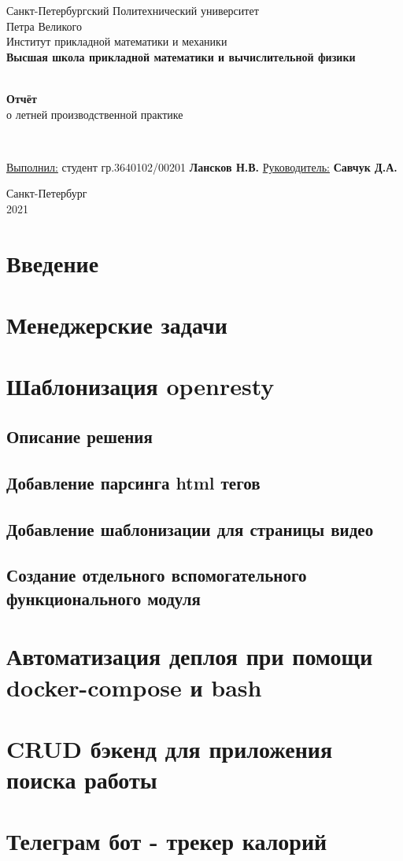 \documentclass[a4papaer,12pt]{article}
\begin{document}
\begin{titlepage}
	\center
		Санкт-Петербургский Политехнический
		университет \\ Петра Великого\\
		Институт прикладной математики и механики
		\\ \textbf{Высшая школа прикладной математики и вычислительной физики}

	\vfill ~
	\textbf{
		\\ \large Отчёт
	}
    \\ о летней производственной практике 

	\vfill ~

    \begin{flushleft}
    \underline{Выполнил:}  \hspace{\fill} студент гр.3640102/00201 \textbf{Лансков Н.В.} \linebreak[2]
	\underline{Руководитель:} \hspace{\fill} \textbf{Савчук Д.А.} \\
    \end{flushleft}

\vfill

{\large}	Санкт-Петербург
\\ 2021
\end{titlepage}

\section{Введение}
\section{Менеджерские задачи}
\section{Шаблонизация openresty}
\subsection{Описание решения}
\subsection{Добавление парсинга html тегов}
\subsection{Добавление шаблонизации для страницы видео}
\subsection{Создание отдельного вспомогательного функционального модуля}
\section{Автоматизация деплоя при помощи docker-compose и bash}
\section{CRUD бэкенд для приложения поиска работы}
\section{Телеграм бот - трекер калорий}
\end{document}
